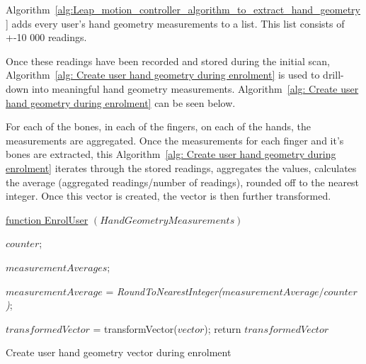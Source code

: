 
Algorithm~\ref{alg:Leap_motion_controller_algorithm_to_extract_hand_geometry} adds every user's hand geometry measurements to a list. This list consists of +-10 000 readings.

Once these readings have been recorded and stored during the initial scan, Algorithm~\ref{alg: Create user hand geometry during enrolment} is used to drill-down into meaningful hand geometry measurements. Algorithm~\ref{alg: Create user hand geometry during enrolment} can be seen below.

For each of the bones, in each of the fingers, on each of the hands, the measurements are aggregated. Once the measurements for each finger and it's bones are extracted, this Algorithm~\ref{alg: Create user hand geometry during enrolment} iterates through the stored readings, aggregates the values, calculates the average (aggregated readings/number of readings), rounded off to the nearest integer. Once this vector is created, the vector is then further transformed. 


\begin{algorithm}
    \underline{function EnrolUser} $(HandGeometryMeasurements)$\;
    
    $counter$; 
    
    $measurementAverages$; 
    
    $measurementAverage$ = \textit{RoundToNearestInteger($measurementAverage/counter$)};
    
    
    
        $transformedVector$ = transformVector($vector$);
    return $transformedVector$
    \caption{Create user hand geometry vector during enrolment}
    \label{alg: Create user hand geometry during enrolment}
    
\end{algorithm}


